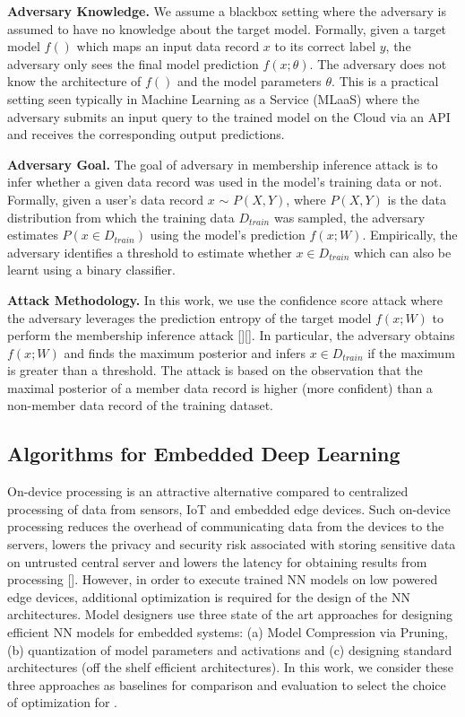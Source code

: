 \noindent\textbf{Adversary Knowledge.} We assume a blackbox setting where the adversary is assumed to have no knowledge about the target model.
Formally, given a target model $f()$ which maps an input data record $x$ to its correct label $y$, the adversary only sees the final model prediction $f(x;\theta)$.
The adversary does not know the architecture of $f()$ and the model parameters $\theta$.
This is a practical setting seen typically in Machine Learning as a Service (MLaaS) where the adversary submits an input query to the trained model on the Cloud via an API and receives the corresponding output predictions.

\noindent\textbf{Adversary Goal.} The goal of adversary in membership inference attack is to infer whether a given data record was used in the model's training data or not.
Formally, given a user's data record $x$ $\sim$ $P(X,Y)$, where $P(X,Y)$ is the data distribution from which the training data $D_{train}$ was sampled, the adversary estimates $P(x \in D_{train})$ using the model's prediction $f(x;W)$.
Empirically, the adversary identifies a threshold to estimate whether $x \in D_{train}$ which can also be learnt using a binary classifier.

\noindent\textbf{Attack Methodology.} In this work, we use the confidence score attack where the adversary leverages the prediction entropy of the target model $f(x;W)$ to perform the membership inference attack [][].
In particular, the adversary obtains $f(x;W)$ and finds the maximum posterior and infers $x \in D_{train}$ if the maximum is greater than a threshold.
The attack is based on the observation that the maximal posterior of a member data record is higher (more confident) than a non-member data record of the training dataset.



\subsection{Algorithms for Embedded Deep Learning}

On-device processing is an attractive alternative compared to centralized processing of data from sensors, IoT and embedded edge devices.
Such on-device processing reduces the overhead of communicating data from the devices to the servers, lowers the privacy and security risk associated with storing sensitive data on untrusted central server and lowers the latency for obtaining results from processing [].
However, in order to execute trained NN models on low powered edge devices, additional optimization is required for the design of the NN architectures.
Model designers use three state of the art approaches for designing efficient NN models for embedded systems: (a) Model Compression via Pruning, (b) quantization of model parameters and activations and (c) designing standard architectures (off the shelf efficient architectures).
In this work, we consider these three approaches as baselines for comparison and evaluation to select the choice of optimization for \method.

